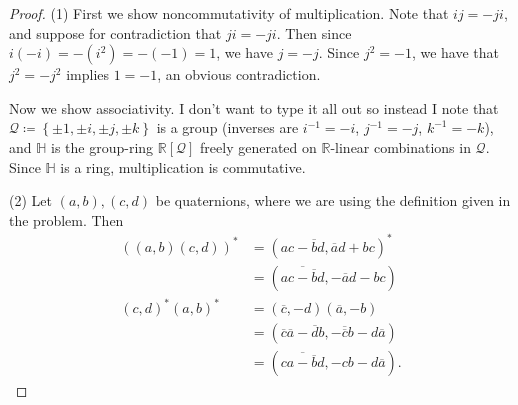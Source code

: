 \documentclass[11pt, letterpaper]{article}
\theoremstyle{plain}
\begin{document}
\begin{proof}
	(1) First we show noncommutativity of multiplication. Note that $ij=-ji$, and suppose for contradiction that $ji=-ji$. Then since $i(-i)=-(i^2)=-(-1)=1$, we have $j=-j$. Since $j^2=-1$, we have that $j^2=-j^2$ implies $1=-1$, an obvious contradiction.

	Now we show associativity. I don't want to type it all out so instead I note that $\mathcal{Q} \coloneqq \left\{ \pm1,\pm i,\pm j,\pm k \right\} $ is a group (inverses are $i^{-1} =-i$, $j^{-1} =-j$, $k^{-1} =-k$), and $\mathbb{H}$ is the group-ring $\mathbb{R} [\mathcal{Q} ]$ freely generated on $\mathbb{R} $-linear combinations in $\mathcal{Q} $. Since $\mathbb{H} $ is a ring, multiplication is commutative.

	(2) Let $(a,b),(c,d)$ be quaternions, where we are using the definition given in the problem. Then
	\begin{align*}
		((a,b)(c,d))^*&=(ac-\overline{b}d ,\overline{a}d+bc)^*\\
			      &=\left( \overline{ac- \overline{b} d} ,- \overline{a} d-bc \right) \\
		(c,d)^*(a,b)^*&=(\overline{c} ,-d)(\overline{a} ,-b)\\
			      &=(\overline{c} \overline{a} - \overline{d} b, - \overline{\overline{c} }  b -d \overline{a} )\\
			      &=\left( \overline{ca - \overline{b} d} ,-c b-d \overline{a}  \right) 
	.\end{align*}
	

\end{proof}
\end{document}
